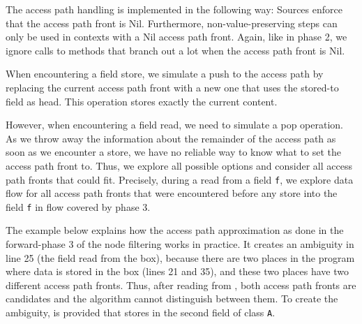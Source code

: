 The access path handling is implemented in the following way:
Sources enforce that the access path front is Nil.
Furthermore, non-value-preserving steps can only be used in contexts with
a Nil access path front.
Again, like in phase 2, we ignore calls to methods that branch out a lot when the
access path front is Nil.

When encountering a field store, we simulate a push to the access path by replacing 
the current access path front with a new one that uses the stored-to field 
as head.
This operation stores exactly the current content.

However, when encountering a field read, we need to simulate a pop operation.
As we throw away the information about the remainder of the access path as soon as 
we encounter a store, we have no reliable way to know what to set the access path front 
to.
Thus, we explore all possible options and consider all access path fronts that could fit.
Precisely, during a read from a field \texttt{f},
we explore data flow for all access path fronts that were encountered before 
any store into the field \texttt{f} in flow covered by phase 3.

The example below explains how the access path approximation as done in the forward-phase 
3 of the node filtering works in practice.
It creates an ambiguity in line 25 (the field read from the box),
because there are two places in the program where data is stored in the box 
(lines 21 and 35), and these two places have two different access path fronts.
Thus, after reading from , both access path fronts are candidates 
and the algorithm cannot distinguish between them.
To create the ambiguity,  is provided that stores 
in the second field of class \texttt{A}.


